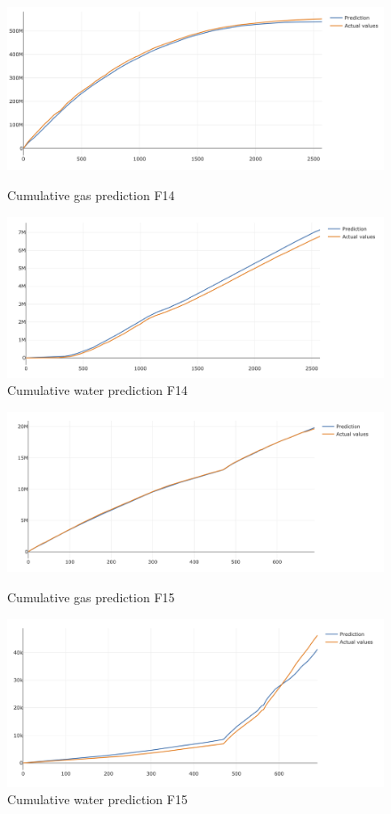 \documentclass[12pt,a4paper]{report}
\begin{document}
\begin{figure}[H]
  \includegraphics[width=\linewidth]{LSTM_gas_water/F14_gas}
  \caption{Cumulative gas prediction F14}\label{fig:awesome_image1}
\endminipage\hfill
{}
  \includegraphics[width=\linewidth]{LSTM_gas_water/F14_water}
  \caption{Cumulative water prediction F14}\label{fig:awesome_image2}
\endminipage\hfill
\end{figure}

\begin{figure}[H]
  \includegraphics[width=\linewidth]{LSTM_gas_water/F15_gas}
  \caption{Cumulative gas prediction F15}\label{fig:awesome_image1}
\endminipage\hfill
{}
  \includegraphics[width=\linewidth]{LSTM_gas_water/F15_water}
  \caption{Cumulative water prediction F15}\label{fig:awesome_image2}
\endminipage\hfill
\end{figure}
\end{document}
